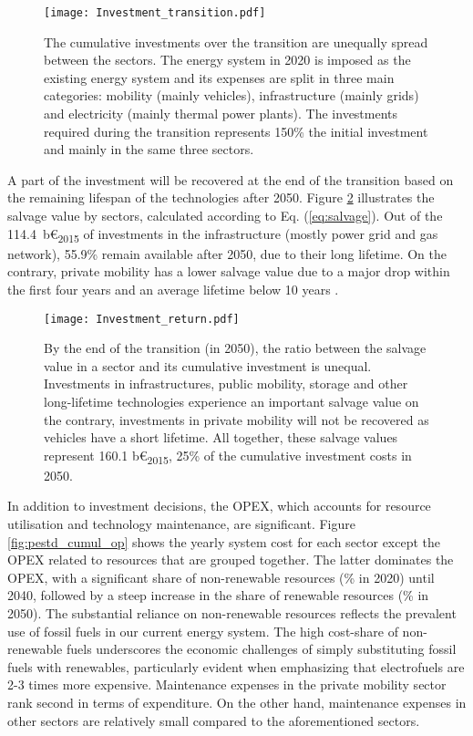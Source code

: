 \begin{figure}[!htbp]
\centering
\texttt{[image: Investment\_transition.pdf]}
\caption{The cumulative investments over the transition are unequally spread between the sectors. The energy system in 2020 is imposed as the existing energy system and its expenses are split in three main categories: mobility (mainly vehicles), infrastructure (mainly grids) and electricity (mainly thermal power plants). The investments required during the transition represents 150\% the initial investment and mainly in the same three sectors. }
\label{fig:pestd_cumul_inv}
\end{figure}

A part of the investment will be recovered at the end of the transition based on the remaining lifespan of the technologies after 2050. Figure \ref{fig:pestd_inv_return} illustrates the salvage value by sectors, calculated according to Eq. (\ref{eq:salvage}). Out of the 114.4~b€\textsubscript{2015} of investments in the infrastructure (\ie mostly power grid and gas network), 55.9\% remain available after 2050, due to their long lifetime. On the contrary, private mobility has a lower salvage value due to a major drop within the first four years and an average lifetime below 10 years \cite{febiac2021datadigest}. 


\begin{figure}[!htbp]
\centering
\texttt{[image: Investment\_return.pdf]}
\caption{By the end of the transition (\ie in 2050), the ratio between the salvage value in a sector and its cumulative investment is unequal. Investments in infrastructures, public mobility, storage and other long-lifetime technologies experience an important salvage value on the contrary, investments in private mobility will not be recovered as vehicles have a short lifetime. All together, these salvage values represent 160.1 b€\textsubscript{2015}, 25\% of the cumulative investment costs in 2050.}
\label{fig:pestd_inv_return}
\end{figure}

In addition to investment decisions, the \acrfull{OPEX}, which accounts for resource utilisation and technology maintenance, are significant. Figure \ref{fig:pestd_cumul_op} shows the yearly system cost for each sector except the \gls{OPEX} related to resources that are grouped together. The latter dominates the \gls{OPEX}, with a significant share of non-renewable resources (\% in 2020) until 2040, followed by a steep increase in the share of renewable resources (\% in 2050). The substantial reliance on non-renewable resources reflects the prevalent use of fossil fuels in our current energy system. The high cost-share of non-renewable fuels underscores the economic challenges of simply substituting fossil fuels with renewables, particularly evident when emphasizing that electrofuels are 2-3 times more expensive. Maintenance expenses in the private mobility sector rank second in terms of expenditure. On the other hand, maintenance expenses in other sectors are relatively small compared to the aforementioned sectors.

